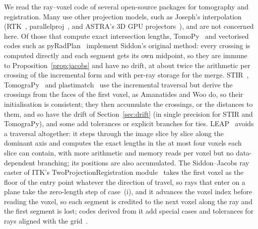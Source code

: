 \documentclass[11pt,a4paper]{article}
\theoremstyle{remark}
\begin{document}
We read the ray--voxel code of several open-source packages for
tomography and registration. Many use other projection models, such as Joseph's
interpolation~\cite{joseph1982} (RTK~\cite{rtk2014}, parallelproj~\cite{parallelproj}, and ASTRA's 3D GPU
projectors~\cite{astra2016}), and are not concerned here. Of those that compute exact intersection lengths,
TomoPy~\cite{tomopy2014} and vectorised codes such as pyRadPlan~\cite{pyradplan} implement Siddon's original
method: every crossing is computed directly and each segment gets its own midpoint, so they are immune to
Proposition~\ref{prop:jacobs} and have no drift, at about twice the arithmetic per crossing of the
incremental form and with per-ray storage for the merge. STIR~\cite{stir2012}, TomograPy~\cite{tomograpy} and
plastimatch~\cite{plastimatch} use the incremental traversal but derive the crossings from the faces of the
first voxel, as Amanatides and Woo do, so their initialisation is consistent; they then accumulate the
crossings, or the distances to them, and so have the drift of Section~\ref{sec:drift} (in single precision
for STIR and TomograPy), and some add tolerances or explicit branches for ties. LEAP~\cite{leap} avoids a
traversal altogether: it steps through the image slice by slice along the dominant axis and computes the
exact lengths in the at most four voxels each slice can contain, with more arithmetic and memory reads per
voxel but no data-dependent branching; its positions are also accumulated. The Siddon--Jacobs ray caster of
ITK's TwoProjectionRegistration module~\cite{itktpr} takes the first voxel as the floor of the entry point
whatever the direction of travel, so rays that enter on a plane take the zero-length step of case~(i), and
it advances the voxel index before reading the voxel, so each segment is credited to the next voxel along
the ray and the first segment is lost; codes derived from it add special cases and tolerances for rays
aligned with the grid~\cite{reg23}.
\end{document}
